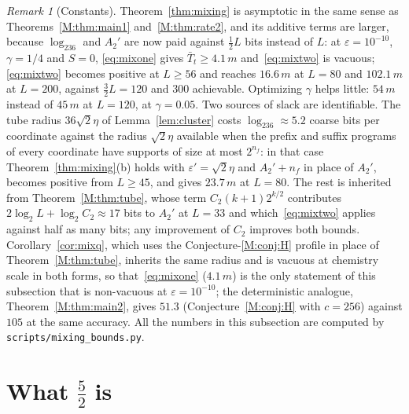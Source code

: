 \documentclass[aps,prx,twocolumn,superscriptaddress,nofootinbib,longbibliography]{revtex4-2}
\theoremstyle{plain}
\theoremstyle{definition}
\theoremstyle{remark}
\newtheorem{remark}{Remark}
\begin{document}
\begin{remark}[Constants]\label{rem:mixconst}
Theorem~\ref{thm:mixing} is asymptotic in the same sense as Theorems~\ref{M:thm:main1} and~\ref{M:thm:rate2}, and its additive terms are larger, because $\log_236$ and $A_2'$ are now paid against $\tfrac12L$ bits instead of $L$: at $\varepsilon=10^{-10}$, $\gamma=1/4$ and $S=0$, \eqref{eq:mixone} gives $\bar T_t\ge4.1\,m$ and~\eqref{eq:mixtwo} is vacuous; \eqref{eq:mixtwo} becomes positive at $L\ge56$ and reaches $16.6\,m$ at $L=80$ and $102.1\,m$ at $L=200$, against $\tfrac32L=120$ and $300$ achievable. Optimizing $\gamma$ helps little: $54\,m$ instead of $45\,m$ at $L=120$, at $\gamma=0.05$. Two sources of slack are identifiable. The tube radius $36\sqrt2\eta$ of Lemma~\ref{lem:cluster} costs $\log_236\approx5.2$ coarse bits per coordinate against the radius $\sqrt2\eta$ available when the prefix and suffix programs of every coordinate have supports of size at most $2^{n_f}$: in that case Theorem~\ref{thm:mixing}(b) holds with $\varepsilon'=\sqrt2\eta$ and $A_2'+n_f$ in place of $A_2'$, becomes positive from $L\ge45$, and gives $23.7\,m$ at $L=80$. The rest is inherited from Theorem~\ref{M:thm:tube}, whose term $C_2(k+1)2^{k/2}$ contributes $2\log_2L+\log_2C_2\approx17$ bits to $A_2'$ at $L=33$ and which~\eqref{eq:mixtwo} applies against half as many bits; any improvement of $C_2$ improves both bounds. Corollary~\ref{cor:mixq}, which uses the Conjecture-\ref{M:conj:H} profile in place of Theorem~\ref{M:thm:tube}, inherits the same radius and is vacuous at chemistry scale in both forms, so that~\eqref{eq:mixone} ($4.1\,m$) is the only statement of this subsection that is non-vacuous at $\varepsilon=10^{-10}$; the deterministic analogue, Theorem~\ref{M:thm:main2}, gives $51.3$ (Conjecture~\ref{M:conj:H} with $c=256$) against $105$ at the same accuracy. All the numbers in this subsection are computed by \texttt{scripts/mixing\_bounds.py}.
\end{remark}

\section{What \texorpdfstring{$\tfrac52$}{5/2} is}\label{sec:what52}
\end{document}
